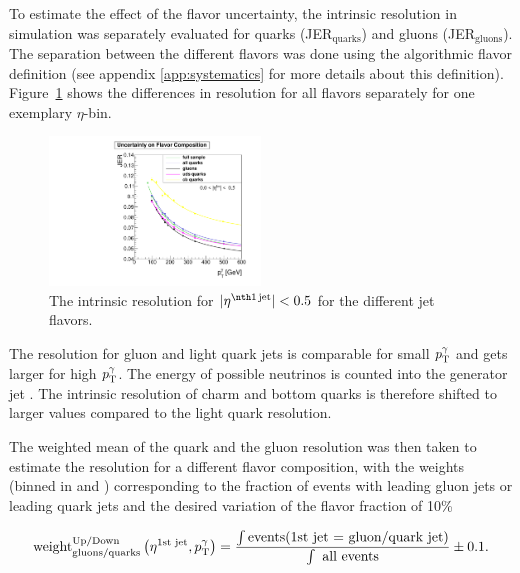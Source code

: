 To estimate the effect of the flavor uncertainty, the intrinsic resolution in simulation was separately evaluated for quarks (JER$_\text{quarks}$) and gluons (JER$_\text{gluons}$). 
The separation between the different flavors was done using the algorithmic flavor definition (see appendix \ref{app:systematics} for more details about this definition).
\mbox{Figure \ref{fig:ResolutionDifferences}} shows the differences in resolution for all flavors separately for one exemplary $\eta$-bin.
\begin{figure}[tp]
  \centering

      \includegraphics[width=0.50\textwidth]{figures/resolution/systematicUncertainties/Resolution_for_1_eta_bin_FlavorUncertainty_RMS99.pdf}
 
  \caption{The intrinsic resolution for $|\etafirstjet| < 0.5$ for the different jet flavors.}  
  \label{fig:ResolutionDifferences}
\end{figure}
The resolution for gluon and light quark jets is comparable for small $p_{\text{T}}^{\gamma}$ and gets larger for high $p_{\text{T}}^{\gamma}$.
The energy of possible neutrinos is counted into the generator jet \pt. 
The intrinsic resolution of charm and bottom quarks is therefore shifted to larger values compared to the light quark resolution.


The weighted mean of the quark and the gluon resolution was then taken to estimate the resolution for a different flavor composition, 
with the weights (binned in \etafirstjet and \ptgamma) 
corresponding to the fraction of events with leading gluon jets or leading quark jets and the desired variation of the flavor fraction of 10\% 

\begin{equation}
\label{FlavorWeights}
 \text{weight}^{\text{Up/Down}}_{\text{gluons/quarks}} \left(\eta^{\text{1st jet}},p_{\text{T}}^{\gamma} \right) = \frac{\int\text{events(1st jet = gluon/quark jet)}}{\int\text{ all events}} \pm 0.1.
\end{equation}

